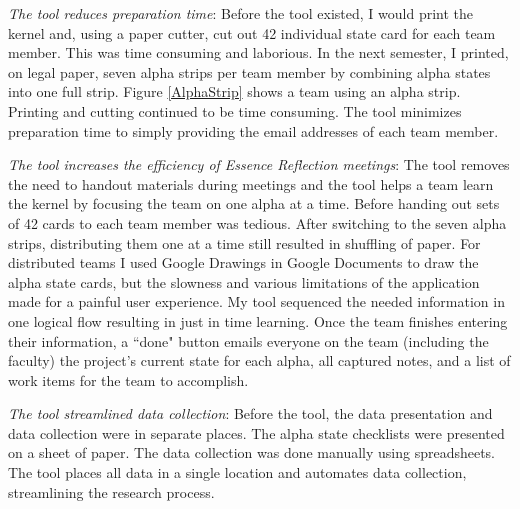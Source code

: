 \documentclass[preprint,12pt,3p]{elsarticle}
\begin{document}
\textit{The tool reduces preparation time}: Before the tool existed, I would print the kernel and, using a paper cutter, cut out 42 individual state card for each team member. This was time consuming and laborious.  In the next semester, I printed, on legal paper, seven alpha strips per team member by combining alpha states into one full strip. Figure \ref{AlphaStrip} shows a team using an alpha strip. Printing and cutting continued to be time consuming. The tool minimizes preparation time to simply providing the email addresses of each team member. 

\textit{The tool increases the efficiency of Essence Reflection meetings}: The tool removes the need to handout materials during meetings and the tool helps a team learn the kernel by focusing the team on one alpha at a time. Before handing out sets of 42 cards to each team member was tedious. After switching to the seven alpha strips, distributing them one at a time still resulted in shuffling of paper. For distributed teams I used Google Drawings in Google Documents to draw the alpha state cards, but the slowness and various limitations of the application made for a painful user experience. My tool sequenced the needed information in one logical flow  resulting in just in time learning. Once the team finishes entering their information, a ``done" button emails everyone on the team (including the faculty) the project's current state for each alpha, all captured notes, and a list of work items for the team to accomplish. 

\textit{The tool streamlined data collection}:  Before the tool, the data presentation and data collection were in separate places. The alpha state checklists were presented on a sheet of paper. The data collection was done manually using spreadsheets. The tool places all data in a single location and automates data collection, streamlining the research process.

\end{document}
